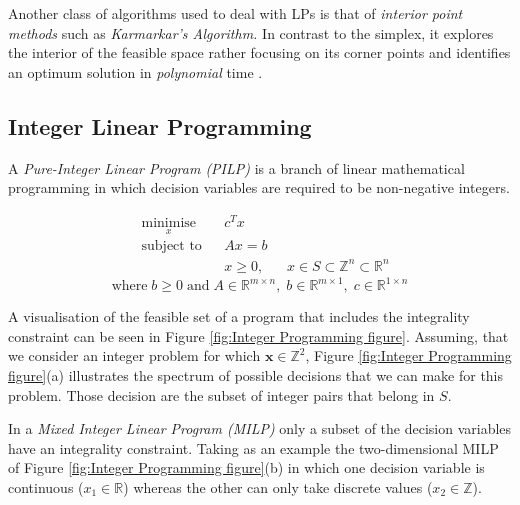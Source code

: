 Another class of algorithms used to deal with LPs is that of \textit{interior point methods} such as \textit{Karmarkar’s Algorithm.} In contrast to the simplex, it explores the interior of the feasible space rather focusing on its corner points and identifies an optimum solution in \textit{polynomial }time \cite{DUMMY:4}.\par


\subsection{Integer Linear Programming}

A \textit{Pure-Integer Linear Program (PILP)} is a branch of linear mathematical programming in which decision variables are required to be non-negative integers.

\vspace{\baselineskip}
\begin{equation}
\begin{aligned}
& \underset{x}{\text{minimise}}
& & c^{T}x \\
& \text{subject to}
& & Ax=b\\
& & & x \geq 0, \;\;\; &x \in S \subset \mathbb{Z}^{n} \subset \mathbb{R}^{n}
\end{aligned}
\end{equation}
\[\text{where} \; b \geq 0 \; \text{and} \; A \in \mathbb{R}^{m \times n}, \; b \in \mathbb{R}^{m \times 1}, \; c \in \mathbb{R}^{1 \times n}\]

\vspace{\baselineskip}
\noindent
A visualisation of the feasible set of a program that includes the integrality constraint can be seen in Figure \ref{fig:Integer Programming figure}. Assuming, that we consider an integer problem for which  $\pmb{x} \in \mathbb{Z}^{2}$, Figure \ref{fig:Integer Programming figure}(a) illustrates the spectrum of possible decisions that we can make for this problem. Those decision are the subset of integer pairs that belong in $S$.

\vspace{\baselineskip}
\noindent
In a \textit{Mixed Integer Linear Program (MILP)} only a subset of the decision variables have an integrality constraint. Taking as an example the two-dimensional MILP of Figure \ref{fig:Integer Programming figure}(b) in which one decision variable is continuous ($x_1 \in \mathbb{R}$) whereas the other can only take discrete values ($x_2 \in \mathbb{Z}$).\par

